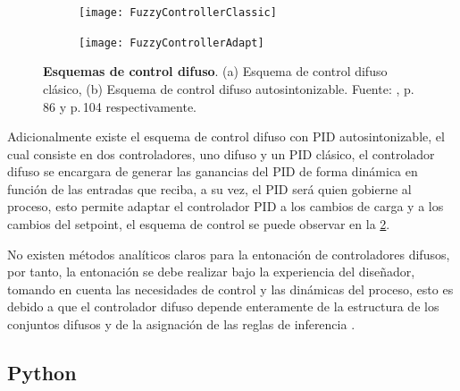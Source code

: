             \begin{figure}[htb]
                \centering
                \begin{subfigure}[t]{0.8\textwidth}
                    \centering
                    \texttt{[image: FuzzyControllerClassic]} %
                    \caption{} 
                    \label{fig:fuzzycontrollerclassic}
                \end{subfigure}
                \hfill
                \begin{subfigure}[t]{0.8\textwidth}
                    \centering
                    \texttt{[image: FuzzyControllerAdapt]} %
                    \caption{}
                    \label{fig:fuzzycontrolleradapt}
                \end{subfigure}
                
                \caption[Esquemas de control difuso]{\textbf{Esquemas de control difuso}. (a) Esquema de control difuso clásico, (b) Esquema de control difuso autosintonizable. Fuente: \textcite{cruz2010inteligencia}, p.$\,$86 y p.$\,$104 respectivamente. \label{fig:FuzzySchems}}
            \end{figure}
            
            Adicionalmente existe el esquema de control difuso con PID autosintonizable, el cual consiste en dos controladores, uno difuso y un PID clásico, el controlador difuso se encargara de generar las ganancias del PID de forma dinámica en función de las entradas que reciba, a su vez, el PID será quien gobierne al proceso, esto permite adaptar el controlador PID a los cambios de carga y a los cambios del setpoint, el esquema de control se puede observar en la \cref{fig:fuzzycontrolleradapt}.

            No existen métodos analíticos claros para la entonación de controladores difusos, por tanto, la entonación se debe realizar bajo la experiencia del diseñador, tomando en cuenta las necesidades de control y las dinámicas del proceso, esto es debido a que el controlador difuso depende enteramente de la estructura de los conjuntos difusos y de la asignación de las reglas de inferencia \Parencite{cruz2010inteligencia}.
        
    \subsection{Python}
        
